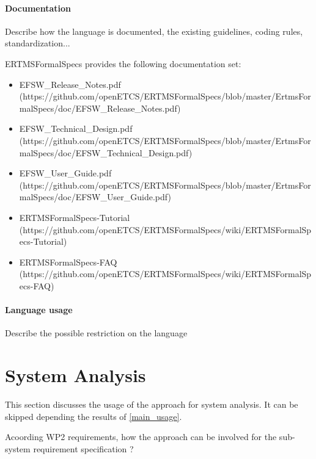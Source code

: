 \begin{author_comment}
\paragraph{Documentation} Describe how the language is documented, the existing guidelines, coding rules, standardization...

ERTMSFormalSpecs provides the following documentation set:

\begin{itemize}
	\item EFSW_Release_Notes.pdf (https://github.com/openETCS/ERTMSFormalSpecs/blob/master/ErtmsFormalSpecs/doc/EFSW_Release_Notes.pdf)
	\item EFSW_Technical_Design.pdf (https://github.com/openETCS/ERTMSFormalSpecs/blob/master/ErtmsFormalSpecs/doc/EFSW_Technical_Design.pdf)
	\item EFSW_User_Guide.pdf (https://github.com/openETCS/ERTMSFormalSpecs/blob/master/ErtmsFormalSpecs/doc/EFSW_User_Guide.pdf)
	\item ERTMSFormalSpecs-Tutorial (https://github.com/openETCS/ERTMSFormalSpecs/wiki/ERTMSFormalSpecs-Tutorial)
	\item ERTMSFormalSpecs-FAQ (https://github.com/openETCS/ERTMSFormalSpecs/wiki/ERTMSFormalSpecs-FAQ)
\end{itemize}


\paragraph{Language usage} Describe the possible restriction on the language



\section{System Analysis}
This section discusses the usage of the approach for system analysis.
It can be skipped depending the results of \ref{main_usage}.

Acoording WP2 requirements, how the approach can be involved for the sub-system requirement specification ?


\end{author_comment}
